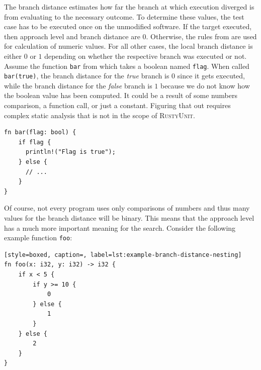 \documentclass[paper=a4,%
  twoside,%
  BCOR4mm,%
  abstract=true,%
  toc=bibliography,%
  chapterprefix=true,%
  toc=bibliographynumbered,%
  open=right,%
  english,%
  pagesize=pdftex]{scrreprt}
\newcommand{\tech}{\textsc{RustyUnit}\xspace}
\begin{document}
The branch distance estimates how far the branch at which execution diverged is from evaluating to the necessary outcome. To determine these values, the test case has to be executed once on the unmodified software. If the target executed, then approach level and branch distance are $0$. Otherwise, the rules from  are used for calculation of numeric values. For all other cases, the local branch distance is either $0$ or $1$ depending on whether the respective branch was executed or not. Assume the function \texttt{bar} from  which takes a boolean named \texttt{flag}. When called \texttt{bar(true)}, the branch distance for the \emph{true} branch is $0$ since it gets executed, while the branch distance for the \emph{false} branch is $1$ because we do not know how the boolean value has been computed. It could be a result of some numbers comparison, a function call, or just a constant. Figuring that out requires complex static analysis that is not in the scope of \tech. 

\begin{lstlisting}[style=boxed, caption={Computation of local branch distance for a boolean flag that we do not know where it came from}, label=lst:example-branch-distance-boolean-flag]
fn bar(flag: bool) {
    if flag {
      println!("Flag is true"); 
    } else {
      // ...
    }
}
\end{lstlisting}

Of course, not every program uses only comparisons of numbers and thus many values for the branch distance will be binary. This means that the approach level has a much more important meaning for the search. Consider the following example function \texttt{foo}:

\begin{lstlisting}[style=boxed, caption=, label=lst:example-branch-distance-nesting]
fn foo(x: i32, y: i32) -> i32 {
    if x < 5 {
        if y >= 10 {
            0
        } else {
            1
        }
    } else {
        2
    }
}
\end{lstlisting}
\end{document}
